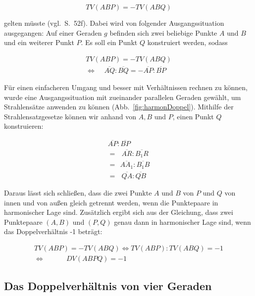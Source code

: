 \documentclass[12pt,a4paper]{article}
\begin{document}
\[TV(A B P) = -TV(A B Q)\]

gelten müsste (vgl.~S.~52f). Dabei wird von folgender Ausgangssituation ausgegangen: Auf einer Geraden $g$ befinden sich zwei beliebige Punkte $A$ und $B$ und ein weiterer Punkt $P$. Es soll ein Punkt $Q$ konstruiert werden, sodass 

\begin{equation*}
\begin{split}
TV(A B P) = -TV(A B Q) \\
\Longleftrightarrow ~~~~~\overline{A Q} : \overline{B Q} = -\overline{A P} : \overline{B P}~~
\end{split}
\end{equation*}

Für einen einfacheren Umgang und besser mit Verhältnissen rechnen zu können, wurde eine Ausgangssituation mit zueinander parallelen Geraden gewählt, um Strahlensätze anwenden zu können (Abb.~\ref{fig:harmonDoppel}). Mithilfe der Strahlensatzgesetze können wir anhand von $A, B$ und $P$, einen Punkt $Q$ konstruieren:

\begin{equation*}
\begin{split}
  \overline{A P} : \overline{B P}~ \\
=~~~\overline{A R} : \overline{B_1 R}  \\
=~~\overline{A A_1} : \overline{B_1 B}  \\
=~~~\overline{Q A} : \overline{Q B}~
\end{split}
\end{equation*}

Daraus lässt sich schließen, dass die zwei Punkte $A$ und $B$ von $P$ und $Q$ von innen und von außen gleich getrennt werden, wenn die Punktepaare in harmonischer Lage sind. Zusätzlich ergibt sich aus der Gleichung, dass zwei Punktepaare $(A, B)$ und $(P, Q)$ genau dann in harmonischer Lage sind, wenn das Doppelverhältnis -1 beträgt:

\begin{equation*}
\begin{split}
TV(A B P) = -TV(A B Q) \Longleftrightarrow TV(A B P) : TV(A B Q) = -1 \\ \Longleftrightarrow ~~~~~~~~~~~~~~DV(A B P Q) = -1
\end{split}
\end{equation*}

\subsection{Das Doppelverhältnis von vier Geraden}
\end{document}
